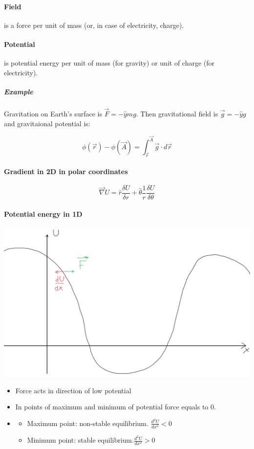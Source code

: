 \paragraph{Field} is a force per unit of mass (or, in case of electricity, charge).
\paragraph{Potential} is potential energy per unit of mass (for gravity) or unit of charge (for electricity).
 \subparagraph{Example} Gravitation on Earth's surface is $\vec{F} = -\hat{y}mg$. Then gravitational field is $\vec{g}=-\hat{y}g$ and gravitaional potential is:
 
 $$\phi(\vec{r}) - \phi(\vec{A}) = \int_{\vec{r}}^{\vec{A}} \vec{g} \cdot d\vec{r}$$
 
 \paragraph{Gradient in 2D in polar coordinates}
 
 $$\vec{\nabla} U = \hat{r} \frac{\delta U}{\delta r} + \hat{\theta}\frac{1}{r}\frac{\delta U}{\delta \theta}$$
 
 \paragraph{Potential energy in 1D}
 
 
 \begin{center}
 	\includegraphics[width=\linewidth]{./lect11/pic1.png}
 	\end{center}
 	
 	\begin{itemize}
 		\item Force acts in direction of low potential
 		\item In points of maximum and minimum of potential force equals to 0.
 		\item \begin{itemize} 
 			\item Maximum point: non-stable equilibrium. $\frac{d^2 U}{dx^2}<0$
 			\item Minimum point: stable equilibrium.$\frac{d^2 U}{dx^2}>0$
 		\end{itemize}
 	\end{itemize}
 	
